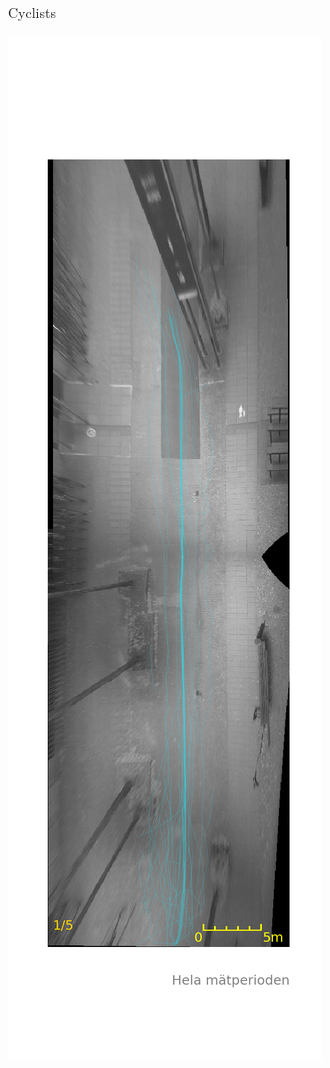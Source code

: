 \documentclass{article}
\begin{document}
\begin{figure}[H]
\begin{subfigure}{.3\textwidth}
  \caption{Cyclists}
  \label{fig:cyc_tra}
\end{subfigure}%
\begin{subfigure}{.3\textwidth}
  \centering
  \includegraphics[width=\linewidth]{data/Data_3.png}

\end{subfigure}
\end{figure}
\end{document}
